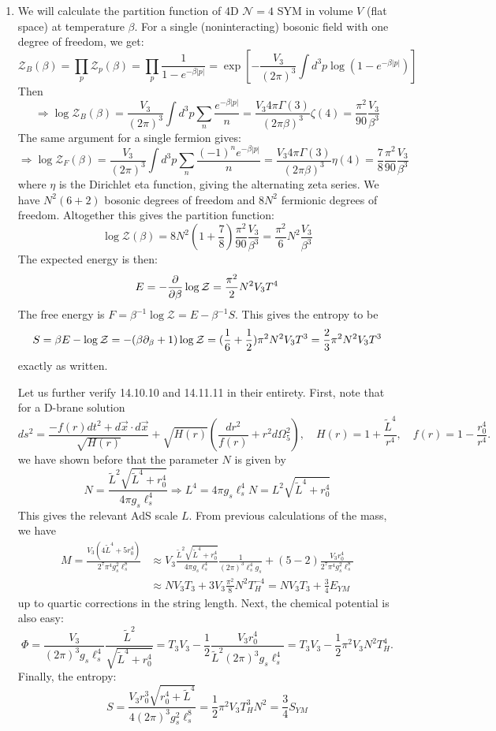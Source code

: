 \documentclass[11pt, class=article, crop=false]{standalone}
\begin{document}
\begin{enumerate}
	\item We will calculate the partition function of 4D $\mathcal N=4$ SYM in volume $V$ (flat space) at temperature $\beta$. For a single (noninteracting) bosonic field with one degree of freedom, we get:
	\[
		\mathcal Z_B(\beta) = \prod_{p} \mathcal Z_{p}(\beta) = \prod_{p} \frac{1}{1- e^{-\beta |p|}} = \exp\left[-\frac{V_3}{(2\pi)^3} \int d^3 p \log(1 - e^{-\beta |p|}) \right]
	\]
	Then
	\[
		\Rightarrow \log \mathcal Z_B(\beta) = \frac{V_3}{(2\pi)^3} \int d^3 p \sum_n \frac{e^{-\beta |p|}}{n} = \frac{V_3 4 \pi \Gamma(3)}{(2\pi \beta)^3}  \zeta(4) = \frac{\pi^2}{90} \frac{V_3}{\beta^3}
	\]
	The same argument for a single fermion gives:
	\[
		\Rightarrow \log \mathcal Z_F(\beta) = \frac{V_3}{(2\pi)^3} \int d^3 p \sum_n \frac{(-1)^n e^{-\beta |p|}}{n} = \frac{V_3 4 \pi \Gamma(3)}{(2\pi \beta)^3}  \eta(4) = \frac78 \frac{\pi^2}{90} \frac{V_3}{\beta^3}
	\]
	where $\eta$ is the Dirichlet eta function, giving the alternating zeta series. We have $N^2 (6 + 2)$ bosonic degrees of freedom and $8 N^2$ fermionic degrees of freedom. Altogether this gives the partition function:
	\[
		\log \mathcal Z(\beta) = 8 N^2 (1 + \frac78) \frac{\pi^2}{90} \frac{V_3}{\beta^3} = \frac{\pi^2}{6} N^2 \frac{V_3}{\beta^3}
	\]
	The expected energy is then:
	\[
		E = - \frac{\partial}{\partial \beta} \log \mathcal Z = \frac{\pi^2}{2} N^2 V_3 T^4
	\]
	The free energy is $F = \beta^{-1} \log \mathcal Z = E - \beta^{-1} S$. This gives the entropy to be 
	\[
		S = \beta E - \log \mathcal Z = -(\beta \partial_\beta + 1) \log \mathcal Z = (\frac16 + \frac12) \pi^2 N^2 V_3 T^3 = \frac23 \pi^2 N^2 V_3 T^3
	\]
	exactly as written. 
	
	Let us further verify 14.10.10 and 14.11.11 in their entirety. First, note that for a D-brane solution
	\[
		ds^2 = \frac{- f(r) dt^2 + d \vec x \cdot d \vec x}{\sqrt{H(r)}} + \sqrt{H(r)}\left(\frac{dr^2}{f(r)} + r^2 d \Omega_5^2 \right), \quad H(r) = 1 + \frac{\tilde L^4}{r^4}, \quad f(r) = 1 - \frac{r_0^4}{r^4}.
	\]
	we have shown before that the parameter $N$ is given by
	\[
		N = \frac{\tilde L^2 \sqrt{\tilde L^4 + r_0^4}}{4 \pi g_s \ell_s^4} \Rightarrow L^4 = 4 \pi g_s \ell_s^4 N = L^2 \sqrt{\tilde L^4 + r_0^4}
	\]
	This gives the relevant AdS scale $L$. From previous calculations of the mass, we have
	\[
	\begin{aligned}
		M = \frac{V_3 (4 \tilde L^4 + 5 r_0^4)}{2^7 \pi^4 g_s^2 \ell_s^8} &\approx V_3 \frac{\tilde L^2 \sqrt{\tilde L^4 + r_0^4}}{4 \pi g_s \ell_s^4} \frac{1}{(2\pi)^3 \ell_s^4 g_s} + (5 - 2) \frac{V_3 r_0^4}{2^7 \pi^4 g_s^2 \ell_s^8}\\
		& \approx  N V_3 T_3+ 3 V_3 \frac{\pi^2}{8} N^2 T_H^{-4} = N V_3 T_3 + \frac34 E_{YM}
	\end{aligned}
	\]
	up to quartic corrections in the string length. Next, the chemical potential is also easy:
	\[
		\Phi = \frac{V_3}{(2\pi)^3 g_s \ell_s^4} \frac{\tilde L^2}{\sqrt{\tilde L^4 + r_0^4}} = T_3 V_3 - \frac12 \frac{V_3 r_0^4}{\tilde L^2 (2\pi)^3 g_s \ell_s^4} = T_3 V_3 - \frac12 \pi^2  V_3 N^2 T_H^4.
	\]
	Finally, the entropy:
	\[
		S = \frac{V_3 r_0^3 \sqrt{r_0^4 + \tilde L^4}}{4 (2\pi)^3 g_s^2 \ell_s^8} = \frac12 \pi^2 V_3 T_H^3 N^2  = \frac34 S_{YM}
	\]
	

\end{enumerate}
\end{document}
